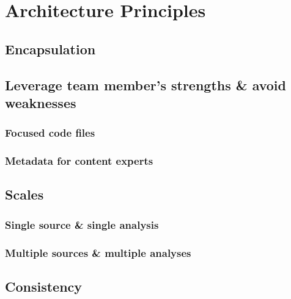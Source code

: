 \documentclass[
]{book}
\begin{document}
\hypertarget{architecture}{%
\chapter{Architecture Principles}\label{architecture}}

\hypertarget{encapsulation}{%
\section{Encapsulation}\label{encapsulation}}

\hypertarget{leverage-team-members-strengths-avoid-weaknesses}{%
\section{Leverage team member's strengths \& avoid weaknesses}\label{leverage-team-members-strengths-avoid-weaknesses}}

\hypertarget{focused-code-files}{%
\subsection{Focused code files}\label{focused-code-files}}

\hypertarget{metadata-for-content-experts}{%
\subsection{Metadata for content experts}\label{metadata-for-content-experts}}

\hypertarget{scales}{%
\section{Scales}\label{scales}}

\hypertarget{single-source-single-analysis}{%
\subsection{Single source \& single analysis}\label{single-source-single-analysis}}

\hypertarget{multiple-sources-multiple-analyses}{%
\subsection{Multiple sources \& multiple analyses}\label{multiple-sources-multiple-analyses}}

\hypertarget{architecture-consistency}{%
\section{Consistency}\label{architecture-consistency}}
\end{document}
